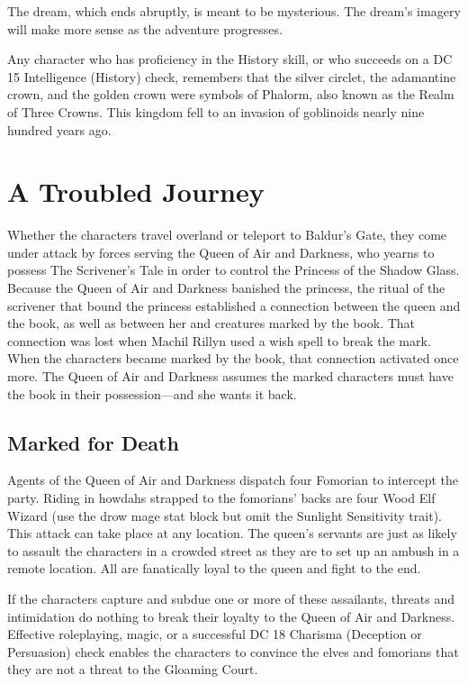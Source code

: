 \documentclass[10pt,a4paper,twoside,bg=print,twocolumn,openany,nodeprecatedcode]{dndbook}
\begin{document}
The dream, which ends abruptly, is meant to be mysterious. The dream's imagery will make more sense as the adventure progresses.

Any character who has proficiency in the History skill, or who succeeds on a DC 15 Intelligence (History) check, remembers that the silver circlet, the adamantine crown, and the golden crown were symbols of Phalorm, also known as the Realm of Three Crowns. This kingdom fell to an invasion of goblinoids nearly nine hundred years ago.

\section{A Troubled Journey}
Whether the characters travel overland or teleport to Baldur's Gate, they come under attack by forces serving the Queen of Air and Darkness, who yearns to possess The Scrivener's Tale in order to control the Princess of the Shadow Glass. Because the Queen of Air and Darkness banished the princess, the ritual of the scrivener that bound the princess established a connection between the queen and the book, as well as between her and creatures marked by the book. That connection was lost when Machil Rillyn used a wish spell to break the mark. When the characters became marked by the book, that connection activated once more. The Queen of Air and Darkness assumes the marked characters must have the book in their possession—and she wants it back.

\subsection{Marked for Death}
Agents of the Queen of Air and Darkness dispatch four Fomorian to intercept the party. Riding in howdahs strapped to the fomorians' backs are four Wood Elf Wizard (use the drow mage stat block but omit the Sunlight Sensitivity trait). This attack can take place at any location. The queen's servants are just as likely to assault the characters in a crowded street as they are to set up an ambush in a remote location. All are fanatically loyal to the queen and fight to the end.

If the characters capture and subdue one or more of these assailants, threats and intimidation do nothing to break their loyalty to the Queen of Air and Darkness. Effective roleplaying, magic, or a successful DC 18 Charisma (Deception or Persuasion) check enables the characters to convince the elves and fomorians that they are not a threat to the Gloaming Court.
\end{document}

